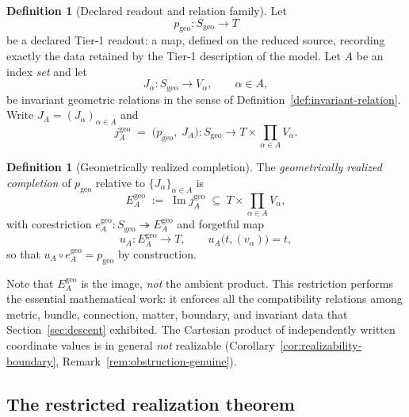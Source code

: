 \documentclass[11pt,a4paper]{article}
\theoremstyle{plain}
\theoremstyle{definition}
\newtheorem{definition}[theorem]{Definition}
\theoremstyle{remark}
\newcommand{\Sgeo}{S_{\mathrm{geo}}}
\newcommand{\Imm}{\operatorname{Im}}
\newcommand{\Egeo}{E_A^{\mathrm{geo}}}
\newcommand{\pgeo}{p_{\mathrm{geo}}}
\newcommand{\jgeo}{j_A^{\mathrm{geo}}}
\newcommand{\egeo}{e_A^{\mathrm{geo}}}
\begin{document}
\begin{definition}[Declared readout and relation family]
\label{def:readout}
Let
\begin{equation}
\label{eq:pgeo}
\pgeo\colon \Sgeo\longrightarrow T
\end{equation}
be a declared Tier-1 readout: a map, defined on the reduced source, recording exactly the data
retained by the Tier-1 description of the model. Let $A$ be an index \emph{set} and let
\begin{equation}
\label{eq:Jalpha}
J_\alpha\colon \Sgeo\longrightarrow V_\alpha,
\qquad \alpha\in A,
\end{equation}
be invariant geometric relations in the sense of Definition~\ref{def:invariant-relation}. Write
$J_A=(J_\alpha)_{\alpha\in A}$ and
\begin{equation}
\label{eq:jgeo}
\jgeo \;=\;\bigl(\pgeo,\;J_A\bigr)\colon
\Sgeo\longrightarrow T\times\prod_{\alpha\in A}V_\alpha .
\end{equation}
\end{definition}

\begin{definition}[Geometrically realized completion]
\label{def:egeo}
The \emph{geometrically realized completion} of $\pgeo$ relative to $\{J_\alpha\}_{\alpha\in A}$ is
\begin{equation}
\label{eq:egeo}
\Egeo \;:=\; \Imm \jgeo \;\subseteq\; T\times\prod_{\alpha\in A}V_\alpha ,
\end{equation}
with corestriction $\egeo\colon\Sgeo\twoheadrightarrow \Egeo$ and forgetful map
\begin{equation}
\label{eq:uA}
u_A\colon \Egeo\longrightarrow T,
\qquad
u_A\bigl(t,(v_\alpha)\bigr)=t ,
\end{equation}
so that $u_A\circ \egeo=\pgeo$ by construction.
\end{definition}

Note that $\Egeo$ is the image, \emph{not} the ambient product. This restriction performs the
essential mathematical work: it enforces all the compatibility relations among metric, bundle,
connection, matter, boundary, and invariant data that Section~\ref{sec:descent} exhibited. The
Cartesian product of independently written coordinate values is in general \emph{not} realizable
(Corollary~\ref{cor:realizability-boundary}, Remark~\ref{rem:obstruction-genuine}).

\subsection{The restricted realization theorem}
\end{document}
